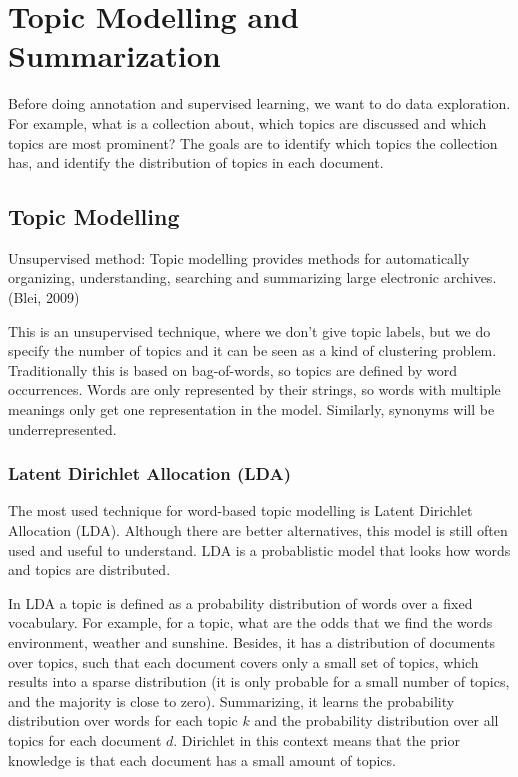 \section{Topic Modelling and Summarization}

Before doing annotation and supervised learning, we want to do data exploration.
For example, what is a collection about, which topics are discussed
and which topics are most prominent?
The goals are to identify which topics the collection has, and
identify the distribution of topics in each document.

\subsection{Topic Modelling}

\begin{definition}
  Unsupervised method: Topic modelling provides methods for
  automatically organizing, understanding, searching and summarizing
  large electronic archives. (Blei, 2009)
\end{definition}

This is an unsupervised technique, where we don't give topic labels,
but we do specify the number of topics
and it can be seen as a kind of clustering problem. Traditionally
this is based on bag-of-words, so topics are
defined by word occurrences. Words are only represented by their
strings, so words with multiple meanings only
get one representation in the model. Similarly, synonyms will be
underrepresented.

\subsubsection{Latent Dirichlet Allocation (LDA)}

The most used technique for word-based topic modelling is Latent
Dirichlet Allocation (LDA). Although there are better alternatives,
this model is still often used and useful to understand. LDA is a
probablistic model that looks how words and topics are distributed.

In LDA a topic is defined as a probability distribution of words over
a fixed vocabulary. For example, for a topic, what are the odds that we
find the words environment, weather and sunshine. Besides, it has a distribution
of documents over topics, such that each document covers only a small
set of topics, which results into a sparse distribution (it is only probable
for a small number of topics, and the majority is close to zero).
Summarizing, it learns the probability distribution over words for
each topic $k$
and the probability distribution over all topics for each document $d$.
Dirichlet in this context means that the prior knowledge is that each document
has a small amount of topics.

